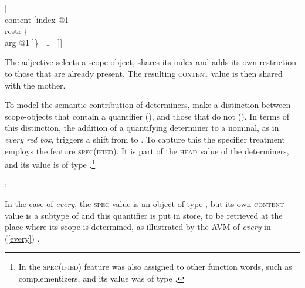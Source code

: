 \documentclass[output=paper
                ,modfonts
                ,nonflat
	        ,collection
	        ,collectionchapter
	        ,collectiontoclongg
 	        ,biblatex
                ,babelshorthands
                ,newtxmath
                ,draftmode
                ,colorlinks, citecolor=brown
]{./langsci/langscibook}
\begin{document}
\begin{exe} 
\ex\label{reddd}
\begin{avm}
[category|head [\type{adjective}                            \\
                mod|loc|content [\type{scope-object}        \\
                                 index @1                   \\
                                 restr \avmbox{$\Sigma$} ]] \\
 content [index @1                                          \\
          restr \{[                               \\
                   arg @1 ]\} ~$\cup$~ \avmbox{$\Sigma$} ]]
\end{avm}
\end{exe}

\noindent
The adjective selects a scope-object, shares its index and adds its own 
restriction to those that are already present. The resulting \textsc{content} 
value is then shared with the mother.

To model the semantic contribution of determiners, \citet[135--136]{GS00} 
make a distinction between scope-objects that contain a quantifier 
(), and those that do not (). 
In terms of this distinction, the addition of a quantifying determiner to a nominal, 
as in \emph{every red box}, triggers a shift from  to . 
To capture this the specifier treatment employs the feature \textsc{spec(ified)}. 
It is part of the \textsc{head} value of the determiners, and its value is of type 
 \citep[362]{GS00}.\footnote{In \citet[45]{ps2} the \textsc{spec(ified)}
feature was also assigned to other function words, such as complementizers, 
and its value was of type .}   

\begin{exe} 
\ex   {}: \begin{avm}  \end{avm}  
\end{exe} 

\noindent
In the case of \emph{every}, the \textsc{spec} value is an object of 
type , but its own \textsc{content} value is a subtype of 
 and this quantifier is put in store, to be retrieved 
at the place where its scope is determined, as illustrated by the AVM
of \emph{every} in (\ref{every}) \citep[204]{GS00}.  
\end{document}

